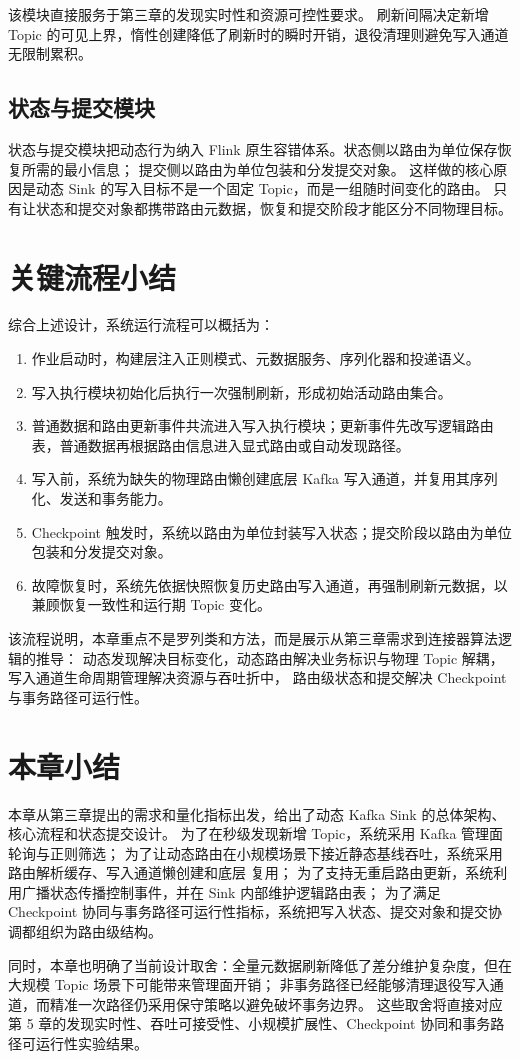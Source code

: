该模块直接服务于第三章的发现实时性和资源可控性要求。
刷新间隔决定新增 Topic 的可见上界，惰性创建降低了刷新时的瞬时开销，退役清理则避免写入通道无限制累积。

\subsection{状态与提交模块}

状态与提交模块把动态行为纳入 Flink 原生容错体系。状态侧以路由为单位保存恢复所需的最小信息；
提交侧以路由为单位包装和分发提交对象。
这样做的核心原因是动态 Sink 的写入目标不是一个固定 Topic，而是一组随时间变化的路由。
只有让状态和提交对象都携带路由元数据，恢复和提交阶段才能区分不同物理目标。

\section{关键流程小结}

综合上述设计，系统运行流程可以概括为：

\begin{enumerate}
  \item 作业启动时，构建层注入正则模式、元数据服务、序列化器和投递语义。
  \item 写入执行模块初始化后执行一次强制刷新，形成初始活动路由集合。
  \item 普通数据和路由更新事件共流进入写入执行模块；更新事件先改写逻辑路由表，普通数据再根据路由信息进入显式路由或自动发现路径。
  \item 写入前，系统为缺失的物理路由懒创建底层 Kafka 写入通道，并复用其序列化、发送和事务能力。
  \item Checkpoint 触发时，系统以路由为单位封装写入状态；提交阶段以路由为单位包装和分发提交对象。
  \item 故障恢复时，系统先依据快照恢复历史路由写入通道，再强制刷新元数据，以兼顾恢复一致性和运行期 Topic 变化。
\end{enumerate}

该流程说明，本章重点不是罗列类和方法，而是展示从第三章需求到连接器算法逻辑的推导：
动态发现解决目标变化，动态路由解决业务标识与物理 Topic 解耦，写入通道生命周期管理解决资源与吞吐折中，
路由级状态和提交解决 Checkpoint 与事务路径可运行性。

\section{本章小结}

本章从第三章提出的需求和量化指标出发，给出了动态 Kafka Sink 的总体架构、核心流程和状态提交设计。
为了在秒级发现新增 Topic，系统采用 Kafka 管理面轮询与正则筛选；
为了让动态路由在小规模场景下接近静态基线吞吐，系统采用路由解析缓存、写入通道懒创建和底层  复用；
为了支持无重启路由更新，系统利用广播状态传播控制事件，并在 Sink 内部维护逻辑路由表；
为了满足 Checkpoint 协同与事务路径可运行性指标，系统把写入状态、提交对象和提交协调都组织为路由级结构。

同时，本章也明确了当前设计取舍：全量元数据刷新降低了差分维护复杂度，但在大规模 Topic 场景下可能带来管理面开销；
非事务路径已经能够清理退役写入通道，而精准一次路径仍采用保守策略以避免破坏事务边界。
这些取舍将直接对应第 5 章的发现实时性、吞吐可接受性、小规模扩展性、Checkpoint 协同和事务路径可运行性实验结果。
